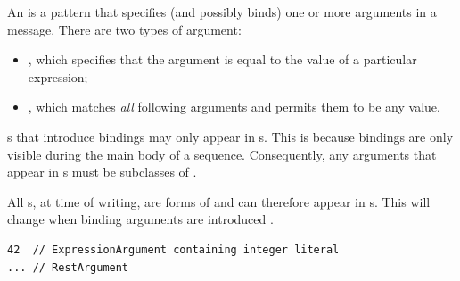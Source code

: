 An \margument{} is a pattern that specifies (and possibly binds) one or more
arguments in
a message.  There are two types of argument:

\begin{itemize}
\item
  \mexpressionargument, which specifies that the argument is equal to the
  value of a particular \robochart{} expression;
\item
  \mrestargument, which matches \emph{all} following arguments and permits
  them to be any value.
\end{itemize}

\margument s that introduce bindings  may only appear in \marrowmessagespec s.
This is because bindings are only visible during the main body of a
sequence.
Consequently, any arguments that appear in
\mgapmessagespec s must be subclasses of \mnonbindingargument.

All \margument s, at time of writing, are forms of \mnonbindingargument{} and
can therefore appear in \mgapmessagespec s.  This will change when binding
arguments are introduced
.

\begin{lstlisting}[style=Example]
42  // ExpressionArgument containing integer literal
... // RestArgument
\end{lstlisting}

